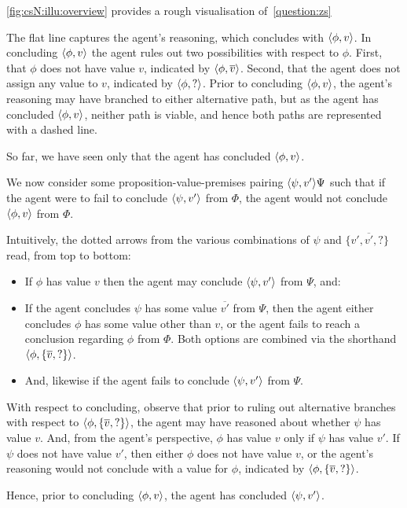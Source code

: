\begin{note}[Figure]
  \autoref{fig:csN:illu:overview} provides a rough visualisation of~\autoref{question:zs}

  The flat line captures the agent's reasoning, which concludes with \(\langle \phi, v \rangle\).
  In concluding \(\langle \phi, v \rangle\) the agent rules out two possibilities with respect to \(\phi\).
  First, that \(\phi\) does not have value \(v\), indicated by \(\langle \phi, \overline{v} \rangle\).
  Second, that the agent does not assign any value to \(v\), indicated by \(\langle \phi, ? \rangle\).
  Prior to concluding \(\langle \phi, v \rangle\), the agent's reasoning may have branched to either alternative path, but as the agent has concluded \(\langle \phi, v \rangle\), neither path is viable, and hence both paths are represented with a dashed line.

  So far, we have seen only that the agent has concluded \(\langle \phi, v \rangle\).

  We now consider some proposition-value-premises pairing \(\langle \psi, v' \rangle{\Psi}\) such that if the agent were to fail to conclude \(\langle \psi, v' \rangle\) from \(\Phi\), the agent would not conclude \(\langle \phi, v \rangle\) from \(\Phi\).

  Intuitively, the dotted arrows from the various combinations of \(\psi\) and \(\{v',\overline{v'},?\}\) read, from top to bottom:
  \begin{itemize}
  \item If \(\phi\) has value \(v\) then the agent may conclude \(\langle \psi, v' \rangle\) from \(\Psi\), and:
  \item If the agent concludes \(\psi\) has some value \(\overline{v'}\) from \(\Psi\), then the agent either concludes \(\phi\) has some value other than \(v\), or the agent fails to reach a conclusion regarding \(\phi\) from \(\Phi\).
    Both options are combined via the shorthand \(\langle \phi, \{\overline{v},?\} \rangle\).
  \item
    And, likewise if the agent fails to conclude \(\langle \psi, v' \rangle\) from \(\Psi\).
  \end{itemize}

  With respect to concluding, observe that prior to ruling out alternative branches with respect to \(\langle \phi, \{\overline{v},?\} \rangle\), the agent may have reasoned about whether \(\psi\) has value \(v\).
  And, from the agent's perspective, \(\phi\) has value \(v\) only if \(\psi\) has value \(v'\).
  If \(\psi\) does not have value \(v'\), then either \(\phi\) does not have value \(v\), or the agent's reasoning would not conclude with a value for \(\phi\), indicated by \(\langle \phi, \{\overline{v},?\} \rangle\).

  Hence, prior to concluding \(\langle \phi, v \rangle\), the agent has concluded \(\langle \psi, v' \rangle\).
\end{note}

